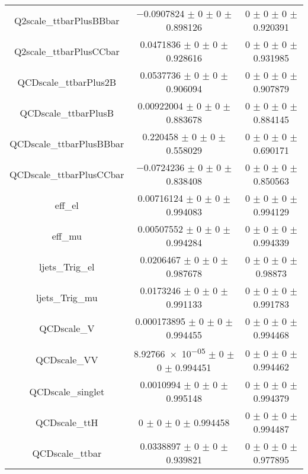 \begin{table}
\begin{tabular}{ccc}
Q2scale\_ttbarPlusBBbar & \num{-0.0907824} $\pm$ \num{0} $\pm$ \num{0} $\pm$ \num{0.898126} & \num{0} $\pm$ \num{0} $\pm$ \num{0} $\pm$ \num{0.920391}\\
Q2scale\_ttbarPlusCCbar & \num{0.0471836} $\pm$ \num{0} $\pm$ \num{0} $\pm$ \num{0.928616} & \num{0} $\pm$ \num{0} $\pm$ \num{0} $\pm$ \num{0.931985}\\
QCDscale\_ttbarPlus2B & \num{0.0537736} $\pm$ \num{0} $\pm$ \num{0} $\pm$ \num{0.906094} & \num{0} $\pm$ \num{0} $\pm$ \num{0} $\pm$ \num{0.907879}\\
QCDscale\_ttbarPlusB & \num{0.00922004} $\pm$ \num{0} $\pm$ \num{0} $\pm$ \num{0.883678} & \num{0} $\pm$ \num{0} $\pm$ \num{0} $\pm$ \num{0.884145}\\
QCDscale\_ttbarPlusBBbar & \num{0.220458} $\pm$ \num{0} $\pm$ \num{0} $\pm$ \num{0.558029} & \num{0} $\pm$ \num{0} $\pm$ \num{0} $\pm$ \num{0.690171}\\
QCDscale\_ttbarPlusCCbar & \num{-0.0724236} $\pm$ \num{0} $\pm$ \num{0} $\pm$ \num{0.838408} & \num{0} $\pm$ \num{0} $\pm$ \num{0} $\pm$ \num{0.850563}\\
eff\_el & \num{0.00716124} $\pm$ \num{0} $\pm$ \num{0} $\pm$ \num{0.994083} & \num{0} $\pm$ \num{0} $\pm$ \num{0} $\pm$ \num{0.994129}\\
eff\_mu & \num{0.00507552} $\pm$ \num{0} $\pm$ \num{0} $\pm$ \num{0.994284} & \num{0} $\pm$ \num{0} $\pm$ \num{0} $\pm$ \num{0.994339}\\
ljets\_Trig\_el & \num{0.0206467} $\pm$ \num{0} $\pm$ \num{0} $\pm$ \num{0.987678} & \num{0} $\pm$ \num{0} $\pm$ \num{0} $\pm$ \num{0.98873}\\
ljets\_Trig\_mu & \num{0.0173246} $\pm$ \num{0} $\pm$ \num{0} $\pm$ \num{0.991133} & \num{0} $\pm$ \num{0} $\pm$ \num{0} $\pm$ \num{0.991783}\\
QCDscale\_V & \num{0.000173895} $\pm$ \num{0} $\pm$ \num{0} $\pm$ \num{0.994455} & \num{0} $\pm$ \num{0} $\pm$ \num{0} $\pm$ \num{0.994468}\\
QCDscale\_VV & \num{8.92766e-05} $\pm$ \num{0} $\pm$ \num{0} $\pm$ \num{0.994451} & \num{0} $\pm$ \num{0} $\pm$ \num{0} $\pm$ \num{0.994462}\\
QCDscale\_singlet & \num{0.0010994} $\pm$ \num{0} $\pm$ \num{0} $\pm$ \num{0.995148} & \num{0} $\pm$ \num{0} $\pm$ \num{0} $\pm$ \num{0.994379}\\
QCDscale\_ttH & \num{0} $\pm$ \num{0} $\pm$ \num{0} $\pm$ \num{0.994458} & \num{0} $\pm$ \num{0} $\pm$ \num{0} $\pm$ \num{0.994487}\\
QCDscale\_ttbar & \num{0.0338897} $\pm$ \num{0} $\pm$ \num{0} $\pm$ \num{0.939821} & \num{0} $\pm$ \num{0} $\pm$ \num{0} $\pm$ \num{0.977895}\\

\end{tabular}
\end{table}
